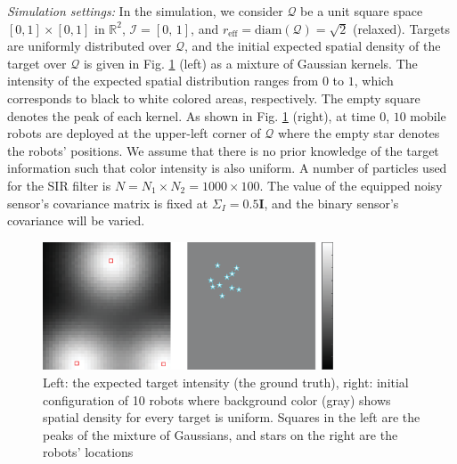 \documentclass[journal]{IEEEtran}
\begin{document}
\textit{Simulation settings:}
In the simulation, we consider  $\mathcal{Q}$ be a unit square space $[0,1]\times [0,1]$ in $\mathbb{R}^2$, $\mathcal{I} = [0,\,1]$, and $r_{\text{eff}} = \text{diam}(\mathcal{Q})=\sqrt{2}$ (relaxed). 
Targets are uniformly distributed over $\mathcal{Q}$, and the initial expected spatial density of the target over $\mathcal{Q}$ is given in Fig. \ref{fig:fig1} (left) as a mixture of Gaussian kernels. The intensity of the expected spatial distribution ranges from $0$ to $1$, which corresponds to black to white colored areas, respectively. The empty square denotes the peak of each kernel.
As shown in Fig. \ref{fig:fig1} (right), at time $0$, $10$ mobile robots are deployed at the upper-left corner of $\mathcal{Q}$ where the empty star denotes the robots' positions. We assume that there is no prior knowledge of the target information such that color intensity is also uniform.
A number of particles used for the SIR filter is $N= N_1\times N_2 = 1000 \times 100$. The value of the equipped noisy sensor's covariance matrix is fixed at $\Sigma_I = 0.5\mathbf{I}$, and the binary sensor's covariance will be varied.
\begin{figure}
	\centering
	\includegraphics[width=3.4in]{figure/init_10_deploy}
	\caption{Left: the expected target intensity (the ground truth), right: initial configuration of 10 robots where background color (gray) shows spatial density for every target is uniform. Squares in the left are the peaks of the mixture of Gaussians, and stars on the right are the robots' locations} 
	\label{fig:fig1}
\end{figure}
\end{document}
